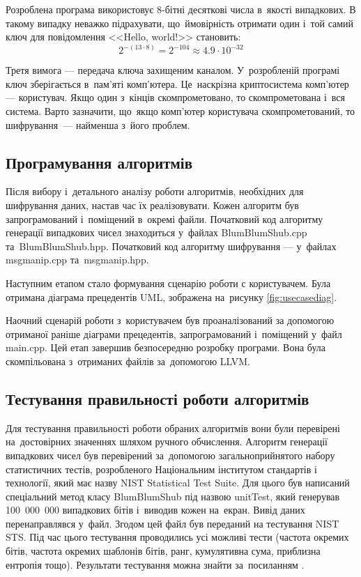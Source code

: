 \documentclass[a4paper,oneside,titlepage,14pt]{extarticle}
\begin{document}
				Розроблена програма використовує 8-бітні десяткові числа в~якості випадкових. В такому випадку неважко підрахувати, що~ймовірність отримати один і~той самий ключ для повідомлення <<Hello, world!>> становить:
				\[
					2^{-(13 \cdot 8)} = 2^{-104} \approx 4.9 \cdot 10^{-32}
				\]
				\par
				Третя вимога --- передача ключа захищеним каналом. У~розробленій програмі ключ зберігається в~пам'яті комп'ютера. Це~наскрізна криптосистема комп'ютер --- користувач. Якщо один з~кінців скомпрометовано, то скомпрометована і~вся система. Варто зазначити, що~якщо комп'ютер користувача скомпрометований, то шифрування~--- найменша з~його проблем.\par
			\subsection{Програмування алгоритмів}
				Після вибору і~детального аналізу роботи алгоритмів, необхідних для шифрування даних, настав час їх реалізовувати. Кожен алгоритм був запрограмований і~поміщений в~окремі файли. Початковий код алгоритму генерації випадкових чисел знаходиться у~файлах BlumBlumShub.cpp та~BlumBlumShub.hpp. Початковий код алгоритму шифрування --- у~файлах msgmanip.cpp та~msgmanip.hpp.\par

			Наступним етапом стало формування сценарію роботи с користувачем. Була отримана діаграма прецедентів UML, зображена на~рисунку \ref{fig:usecasediag}.\par
			Наочний сценарій роботи з~користувачем був проаналізований за допомогою отриманої раніше діаграми прецедентів, запрограмований і~поміщений у~файл main.cpp. Цей етап завершив безпосередню розробку програми. Вона була скомпільована з~отриманих файлів за~допомогою LLVM.\par
			\subsection{Тестування правильності роботи алгоритмів}
				Для тестування правильності роботи обраних алгоритмів вони були перевірені на~достовірних значеннях шляхом ручного обчислення. Алгоритм генерації випадкових чисел був перевірений за~допомогою загальноприйнятого набору статистичних тестів, розробленого Національним інститутом стандартів і технології, який має назву NIST Statistical Test Suite. Для цього був написаний спеціальний метод класу BlumBlumShub під назвою unitTest, який генерував 100~000~000 випадкових бітів і~виводив кожен на~екран. Вивід даних перенаправлявся у~файл. Згодом цей файл був переданий на тестування NIST STS. Під час цього тестування проводились усі можливі тести (частота окремих бітів, частота окремих шаблонів бітів, ранг, кумулятивна сума, приблизна ентропія тощо). Результати тестування можна знайти за~посиланням \cite{githubrepo}.\par
\end{document}
